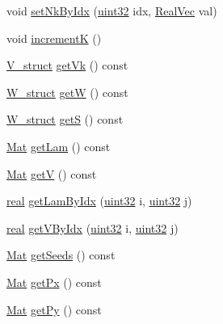 \begin{DoxyCompactItemize}
\item 
void \mbox{\hyperlink{classvd_aa45da38425cbd5b48f61313323ba6204}{set\+Nk\+By\+Idx}} (\mbox{\hyperlink{typedefs_8cpp_a8ad23e2333787a214e20a58a284a5a60}{uint32}} idx, \mbox{\hyperlink{typedefs_8cpp_a84b6d9a0fbb45e01ad4a3aa5667f2992}{Real\+Vec}} val)
\item 
void \mbox{\hyperlink{classvd_a59c1f5756af7de9cc7a0089221cbd5b7}{incrementK}} ()
\item 
\mbox{\hyperlink{structV__struct}{V\+\_\+struct}} \mbox{\hyperlink{classvd_a090bebdbbff36888934c870daf3dcb36}{get\+Vk}} () const
\item 
\mbox{\hyperlink{structW__struct}{W\+\_\+struct}} \mbox{\hyperlink{classvd_ab4d0d9ea76cedf1a6825b62c9ec2d118}{getW}} () const
\item 
\mbox{\hyperlink{structW__struct}{W\+\_\+struct}} \mbox{\hyperlink{classvd_a7f901e0c6d226b81f262c2363a69844a}{getS}} () const
\item 
\mbox{\hyperlink{typedefs_8cpp_a9fa28c1f74e909474857584f5c7b0088}{Mat}} \mbox{\hyperlink{classvd_a37c4ab12669eb276fe7fa4a610310345}{get\+Lam}} () const
\item 
\mbox{\hyperlink{typedefs_8cpp_a9fa28c1f74e909474857584f5c7b0088}{Mat}} \mbox{\hyperlink{classvd_aad4ea5c045b8380f83b0490af2fee0fa}{getV}} () const
\item 
\mbox{\hyperlink{typedefs_8cpp_a58a0c7cf2501f4492da833421be92547}{real}} \mbox{\hyperlink{classvd_ae0ec132e647b7d9662bf2bfbf95e7297}{get\+Lam\+By\+Idx}} (\mbox{\hyperlink{typedefs_8cpp_a8ad23e2333787a214e20a58a284a5a60}{uint32}} i, \mbox{\hyperlink{typedefs_8cpp_a8ad23e2333787a214e20a58a284a5a60}{uint32}} j)
\item 
\mbox{\hyperlink{typedefs_8cpp_a58a0c7cf2501f4492da833421be92547}{real}} \mbox{\hyperlink{classvd_a27d44f2c94b55723e9982446696b5cee}{get\+V\+By\+Idx}} (\mbox{\hyperlink{typedefs_8cpp_a8ad23e2333787a214e20a58a284a5a60}{uint32}} i, \mbox{\hyperlink{typedefs_8cpp_a8ad23e2333787a214e20a58a284a5a60}{uint32}} j)
\item 
\mbox{\hyperlink{typedefs_8cpp_a9fa28c1f74e909474857584f5c7b0088}{Mat}} \mbox{\hyperlink{classvd_a82f353c594c3c6b24f6077398f059d3a}{get\+Seeds}} () const
\item 
\mbox{\hyperlink{typedefs_8cpp_a9fa28c1f74e909474857584f5c7b0088}{Mat}} \mbox{\hyperlink{classvd_aeba6d318016c8f8b9537ce4c0314f8cd}{get\+Px}} () const
\item 
\mbox{\hyperlink{typedefs_8cpp_a9fa28c1f74e909474857584f5c7b0088}{Mat}} \mbox{\hyperlink{classvd_a9738711704b1d03cdbe027b1976cb0c6}{get\+Py}} () const

\end{DoxyCompactItemize}
